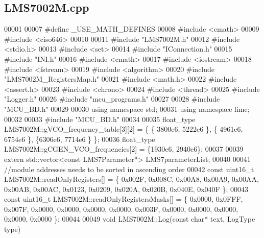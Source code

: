 \subsection{L\+M\+S7002\+M.\+cpp}
\label{LMS7002M_8cpp_source}

\begin{DoxyCode}
00001 
00007 \textcolor{preprocessor}{#define \_USE\_MATH\_DEFINES}
00008 \textcolor{preprocessor}{#include <cmath>}
00009 \textcolor{preprocessor}{#include <ciso646>}
00010 
00011 \textcolor{preprocessor}{#include "LMS7002M.h"}
00012 \textcolor{preprocessor}{#include <stdio.h>}
00013 \textcolor{preprocessor}{#include <set>}
00014 \textcolor{preprocessor}{#include "IConnection.h"}
00015 \textcolor{preprocessor}{#include "INI.h"}
00016 \textcolor{preprocessor}{#include <cmath>}
00017 \textcolor{preprocessor}{#include <iostream>}
00018 \textcolor{preprocessor}{#include <fstream>}
00019 \textcolor{preprocessor}{#include <algorithm>}
00020 \textcolor{preprocessor}{#include "LMS7002M_RegistersMap.h"}
00021 \textcolor{preprocessor}{#include <math.h>}
00022 \textcolor{preprocessor}{#include <assert.h>}
00023 \textcolor{preprocessor}{#include <chrono>}
00024 \textcolor{preprocessor}{#include <thread>}
00025 \textcolor{preprocessor}{#include "Logger.h"}
00026 \textcolor{preprocessor}{#include "mcu_programs.h"}
00027 
00028 \textcolor{preprocessor}{#include "MCU_BD.h"}
00029 
00030 \textcolor{keyword}{using namespace }std;
00031 \textcolor{keyword}{using namespace }lime;
00032 
00033 \textcolor{preprocessor}{#include "MCU_BD.h"}
00034 
00035 float_type LMS7002M::gVCO\_frequency\_table[3][2] = \{ \{ 3800e6, 5222e6 \}, \{ 4961e6, 6754e6 \}, \{6306e6, 7714e6
      \} \};
00036 float_type LMS7002M::gCGEN\_VCO\_frequencies[2] = \{1930e6, 2940e6\};
00037 
00039 \textcolor{keyword}{extern} std::vector<const LMS7Parameter*> LMS7parameterList;
00040 
00041 \textcolor{comment}{//module addresses needs to be sorted in ascending order}
00042 \textcolor{keyword}{const} uint16\_t LMS7002M::readOnlyRegisters[] =      \{ 0x002F, 0x008C, 0x00A8, 0x00A9, 0x00AA, 0x00AB, 
      0x00AC, 0x0123, 0x0209, 0x020A, 0x020B, 0x040E, 0x040F \};
00043 \textcolor{keyword}{const} uint16\_t LMS7002M::readOnlyRegistersMasks[] = \{ 0x0000, 0x0FFF, 0x007F, 0x0000, 0x0000, 0x0000, 
      0x0000, 0x003F, 0x0000, 0x0000, 0x0000, 0x0000, 0x0000 \};
00044 
00049 \textcolor{keywordtype}{void} LMS7002M::Log(\textcolor{keyword}{const} \textcolor{keywordtype}{char}* text, LogType type)

\end{DoxyCode}

